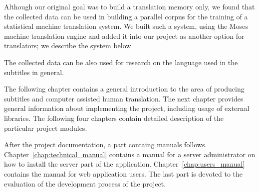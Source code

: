 Although our original goal was to build a translation memory only, we found that the collected data can be used in building a parallel corpus for the training of a statistical machine translation system. We built such a system, using the Moses machine translation engine and added it into our project as another option for translators; we describe the system below.

The collected data can be also used for research on the language used in the subtitles in general.

The following chapter contains a general introduction to the area of producing subtitles and computer assisted human translation. The next chapter provides general information about implementing the project, including usage of external libraries. The following four chapters contain detailed description of the particular project modules.

After the project documentation, a part containg manuals follows. Chapter~\ref{chap:technical_manual} contains a manual for a server administrator on how to install the server part of the application. Chapter~\ref{chap:users_manual} contains the manual for web application users. The last part is devoted to the evaluation of the development process of the project.